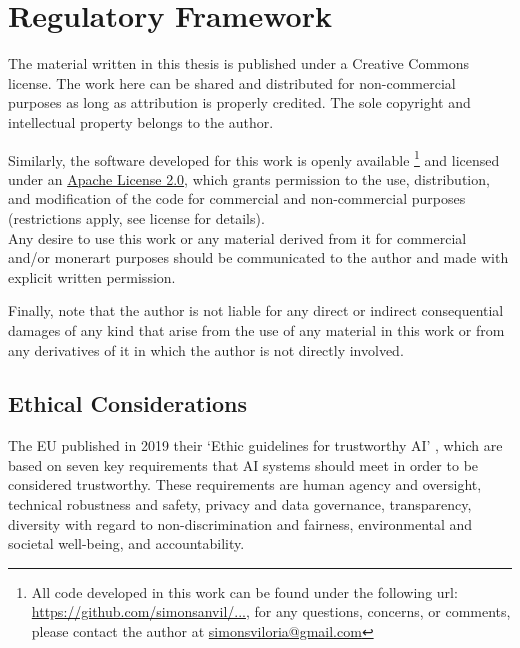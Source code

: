 \documentclass[../main.tex]{subfiles}
\begin{document}
\chapter*{Regulatory Framework} \label{chap:regulatory_framework}

The material written in this thesis is published under a Creative Commons license. The work here can be shared and distributed for non-commercial purposes as long as attribution is properly credited. The sole copyright and intellectual property belongs to the author. 

Similarly, the software developed for this work is openly available
\footnote{All code developed in this work can be found under the following url: \href{}{https://github.com/simonsanvil/...}, for any questions, concerns, or comments, please contact the author at \href{mailto:simonsviloria@gmail.com}{simonsviloria@gmail.com}
} 
and licensed under an \href{https://en.wikipedia.org/wiki/Apache_License}{Apache License 2.0}, which grants permission to the use, distribution, and modification of the code for commercial and non-commercial purposes (restrictions apply, see license for details). \\

Any desire to use this work or any material derived from it for commercial and/or monerart purposes should be communicated to the author and made with explicit written permission.


Finally, note that the author is not liable for any direct or indirect consequential damages of any kind that arise from the use of any material in this work or from any derivatives of it in which the author is not directly involved.

\section*{Ethical Considerations}  \label{ethics}

The EU published in 2019 their `Ethic guidelines for trustworthy AI' \cite{noauthor_ethics_2019}, which are based on seven key requirements that AI systems should meet in order to be considered trustworthy. These requirements are human agency and oversight, technical robustness and safety, privacy and data governance, transparency, diversity with regard to non-discrimination and fairness, environmental and societal well-being, and accountability. 
\end{document}
